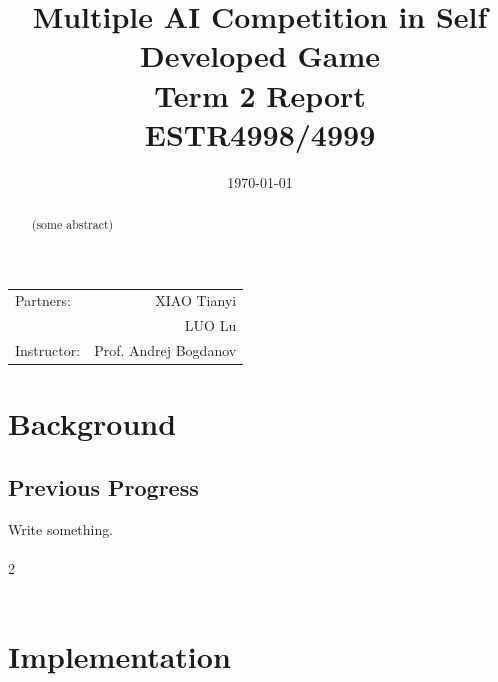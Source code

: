 \documentclass[14pt]{extarticle}
\title{\large Multiple AI Competition in Self Developed Game \\ Term 2 Report \\ ESTR4998/4999} %
\date{\today} %
\begin{document}
\maketitle %

\begin{center}
\begin{tabular}{l r}
Partners: & XIAO Tianyi \\ %
& LUO Lu \\
Instructor: & Prof. Andrej Bogdanov %
\end{tabular}
\end{center}
\newpage



\begin{abstract}
	(some abstract)
\end{abstract}
 

\section{Background}

\subsection{Previous Progress}
Write something.\\\\
2\\\\



\section{Implementation}
\end{document}
